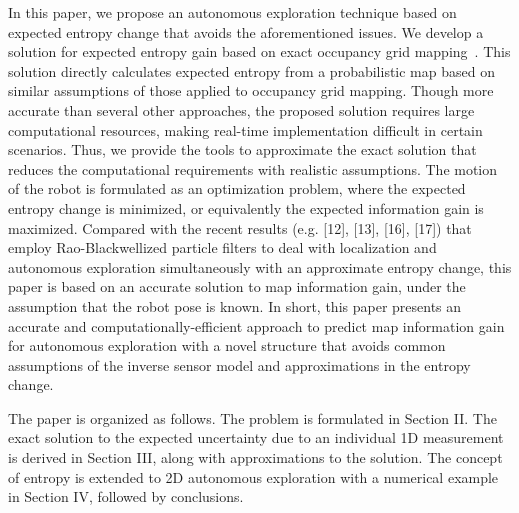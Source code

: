 \documentclass[letterpaper, 10pt, conference]{ieeeconf}
\begin{document}
In this paper, we propose an autonomous exploration technique based on expected entropy change that avoids the aforementioned issues. 
We develop a solution for expected entropy gain based on exact occupancy grid mapping~\cite{KauLeeAiMos16}. This solution directly calculates expected entropy from a probabilistic map based on similar assumptions of those applied to occupancy grid mapping.
Though more accurate than several other approaches, the proposed solution requires large computational resources, making real-time implementation difficult in certain scenarios.
Thus, we provide the tools to approximate the exact solution that reduces the computational requirements with realistic assumptions.
The motion of the robot is formulated as an optimization problem, where the expected entropy change is minimized, or equivalently the expected information gain is maximized.
Compared with the recent results (e.g. [12], [13], [16], [17]) that employ Rao-Blackwellized particle filters to deal with localization and autonomous exploration simultaneously with an approximate entropy change, this paper is based on an accurate solution to map information gain, under the assumption that the robot pose is known. In short, this paper presents an accurate and computationally-efficient approach to predict
map information gain for autonomous exploration with a novel structure that avoids common assumptions of the inverse sensor model and approximations in the entropy change.



The paper is organized as follows. The problem is formulated in Section II. The exact solution to the expected uncertainty due to an individual 1D measurement is derived in Section III, along with approximations to the solution. The concept of entropy is extended to 2D autonomous exploration with a numerical example in Section IV, followed by conclusions.
\end{document}
